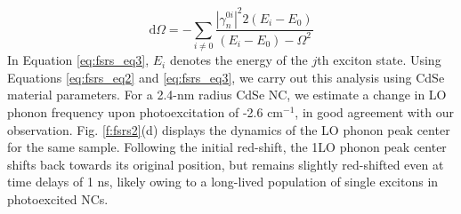 \begin{equation} \label{eq:fsrs_eq3}
\mathrm{d}\Omega = -\sum_{i \neq 0}\frac{|\gamma_n^{0i}|^2 2\left(E_i - E_0\right)}{\left(E_i - E_0\right) - \Omega^2}
\end{equation}
In Equation \ref{eq:fsrs_eq3}, $E_i$ denotes the energy of the $j$th exciton state.  Using Equations \ref{eq:fsrs_eq2} and \ref{eq:fsrs_eq3}, we carry out this analysis using CdSe material parameters.  For a 2.4-nm radius CdSe NC, we estimate a change in LO phonon frequency upon photoexcitation of -2.6 cm$^{-1}$, in good agreement with our observation.  Fig. \ref{f:fsrs2}(d) displays the dynamics of the LO phonon peak center for the same sample.  Following the initial red-shift, the 1LO phonon peak center shifts back towards its original position, but remains slightly red-shifted even at time delays of 1 ns, likely owing to a long-lived population of single excitons in photoexcited NCs. \par


